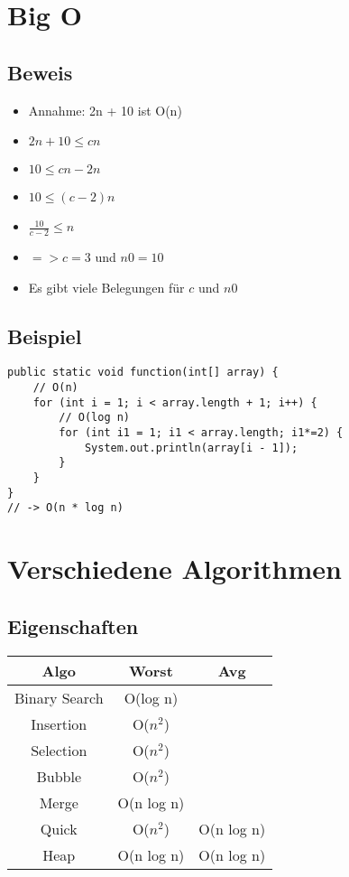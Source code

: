 

\newcommand{\SUBJECT}{}
\newcommand{\TITLE}{Cheat Sheet Objektorientierte Programmierung 2}



\begin{multicols*}{4}
    \setlength{\columnseprule}{0.2pt}
		\footnotesize

\section{Big O}

	\subsection{Beweis}
	\begin{itemize}
		\item Annahme: 2n + 10 ist O(n)
		\item $2n + 10 \leq cn$
		\item $10 \leq cn - 2n$
		\item $10 \leq (c - 2)n$
		\item $\frac{10}{c-2} \leq n$
		\item $=> c=3$ und $n0=10$
		\item Es gibt viele Belegungen für $c$ und $n0$
	\end{itemize}

	\subsection{Beispiel}
	\begin{lstlisting}
public static void function(int[] array) {
	// O(n)
	for (int i = 1; i < array.length + 1; i++) {
		// O(log n)
		for (int i1 = 1; i1 < array.length; i1*=2) {
			System.out.println(array[i - 1]);
		}
	}
}
// -> O(n * log n)
	\end{lstlisting}

\section{Verschiedene Algorithmen}
	\subsection{Eigenschaften}

	\renewcommand{\arraystretch}{1.1}
	\begin{tabular}{c | c | c}
		Algo & Worst & Avg \\
		\hline
		Binary Search & O(log n) & \\
		Insertion & O($n^2$) &  \\
		Selection & O($n^2$) &  \\
		Bubble & O($n^2$) &  \\
		Merge & O(n log n) &  \\
		Quick & O($n^2$) & O(n log n) \\
		Heap & O(n log n) & O(n log n) \\
	\end{tabular}
	

\end{multicols*}

